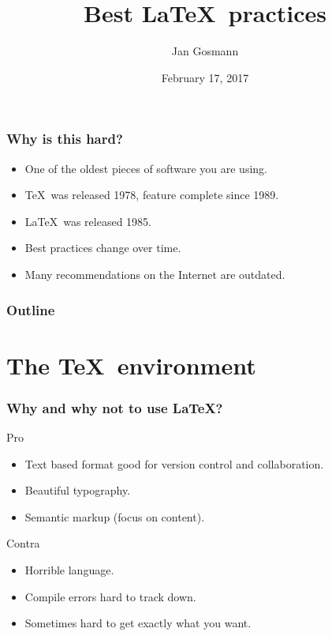 \documentclass[aspectratio=1610,hyperref={colorlinks,linkcolor=}]{beamer}
\title{Best \LaTeX\ practices}
\author{Jan Gosmann}
\date{February 17, 2017}
\begin{document}
\maketitle

\begin{frame}
    \frametitle{Why is this hard?}
    \begin{itemize}
        \item One of the oldest pieces of software you are using.
        \item \TeX\ was released 1978, feature complete since 1989.
        \item \LaTeX\ was released 1985.
        \item Best practices change over time.
        \item Many recommendations on the Internet are outdated.
    \end{itemize}
\end{frame}


\begin{frame}
    \frametitle{Outline}
    \tableofcontents
\end{frame}

\section{The \TeX\ environment}
\begin{frame}
    \frametitle{Why and why not to use \LaTeX?}
    \begin{block}{Pro}
        \begin{itemize}
            \item Text based format good for version control and collaboration.
            \item Beautiful typography.
            \item Semantic markup (focus on content).
        \end{itemize}
    \end{block}
    \begin{block}{Contra}
        \begin{itemize}
            \item Horrible language.
            \item Compile errors hard to track down.
            \item Sometimes hard to get exactly what you want.
        \end{itemize}
    \end{block}
\end{frame}
\end{document}
